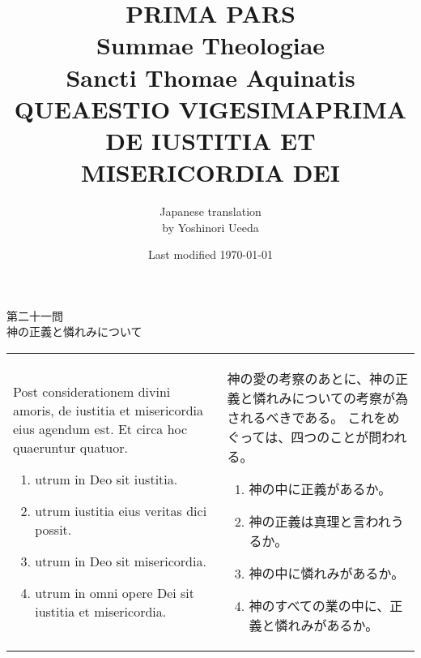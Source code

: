 \documentclass[10pt]{jsarticle} %
\title{{\bf PRIMA PARS}\\{\HUGE Summae Theologiae}\\Sancti Thomae
Aquinatis\\{\sffamily QUEAESTIO VIGESIMAPRIMA}\\DE IUSTITIA ET
MISERICORDIA DEI}
\author{Japanese translation\\by Yoshinori {\sc Ueeda}}
\date{Last modified \today}
\begin{document}
\maketitle
\pagestyle{fancy}

\begin{center}
{\Large 第二十一問\\神の正義と憐れみについて}
\end{center}


\begin{longtable}{p{21em}p{21em}}

Post considerationem divini amoris, de iustitia et misericordia eius
 agendum est. Et circa hoc quaeruntur quatuor. 
\begin{enumerate}
 \item utrum in Deo sit iustitia.
 \item utrum iustitia eius veritas dici possit.
 \item utrum in Deo sit misericordia.
 \item utrum in omni opere Dei sit iustitia et misericordia.
\end{enumerate}

&

神の愛の考察のあとに、神の正義と憐れみについての考察が為されるべきである。
これをめぐっては、四つのことが問われる。
\begin{enumerate}
 \item 神の中に正義があるか。
 \item 神の正義は真理と言われうるか。
 \item 神の中に憐れみがあるか。
 \item 神のすべての業の中に、正義と憐れみがあるか。
\end{enumerate}
\end{longtable}


\newpage
\end{document}
